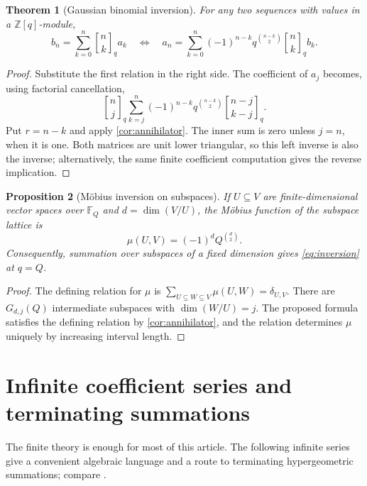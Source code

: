 \documentclass[11pt,a4paper]{article}
\numberwithin{equation}{section}
\newtheorem{theorem}{Theorem}[section]
\newtheorem{proposition}[theorem]{Proposition}
\theoremstyle{definition}
\theoremstyle{remark}
\newcommand{\Z}{\mathbb Z}
\newcommand{\G}[2]{\genfrac{[}{]}{0pt}{}{#1}{#2}_{q}}
\begin{document}
\begin{theorem}[Gaussian binomial inversion]
\label{thm:inversion}
For any two sequences with values in a $\Z[q]$-module,
\begin{equation}
 b_n=\sum_{k=0}^n\G nk a_k
 \quad\Longleftrightarrow\quad
 a_n=\sum_{k=0}^n(-1)^{n-k}q^{\binom{n-k}2}\G nk b_k.
 \label{eq:inversion}
\end{equation}
\end{theorem}
\begin{proof}
Substitute the first relation in the right side. The coefficient of
$a_j$ becomes, using factorial cancellation,
\[
 \G nj\sum_{k=j}^n(-1)^{n-k}q^{\binom{n-k}2}\G{n-j}{k-j}.
\]
Put $r=n-k$ and apply \cref{cor:annihilator}. The inner sum is zero
unless $j=n$, when it is one. Both matrices are unit lower triangular,
so this left inverse is also the inverse; alternatively, the same finite
coefficient computation gives the reverse implication.
\end{proof}

\begin{proposition}[M\"obius inversion on subspaces]
If $U\subseteq V$ are finite-dimensional vector spaces over $\mathbb F_Q$
and $d=\dim(V/U)$, the M\"obius function of the subspace lattice is
\begin{equation}
 \mu(U,V)=(-1)^dQ^{\binom d2}.
 \label{eq:mobius}
\end{equation}
Consequently, summation over subspaces of a fixed dimension gives
\cref{eq:inversion} at $q=Q$.
\end{proposition}
\begin{proof}
The defining relation for $\mu$ is
$\sum_{U\subseteq W\subseteq V}\mu(U,W)=\delta_{U,V}$.
There are $G_{d,j}(Q)$ intermediate subspaces with $\dim(W/U)=j$.
The proposed formula satisfies the defining relation by
\cref{cor:annihilator}, and the relation determines $\mu$ uniquely
by increasing interval length.
\end{proof}

\section{Infinite coefficient series and terminating summations}
\label{sec:infinite}
The finite theory is enough for most of this article. The following
infinite series give a convenient algebraic language and a route to
terminating hypergeometric summations; compare \cite{dlmf17,dlmf175,dlmf176}.
\end{document}
